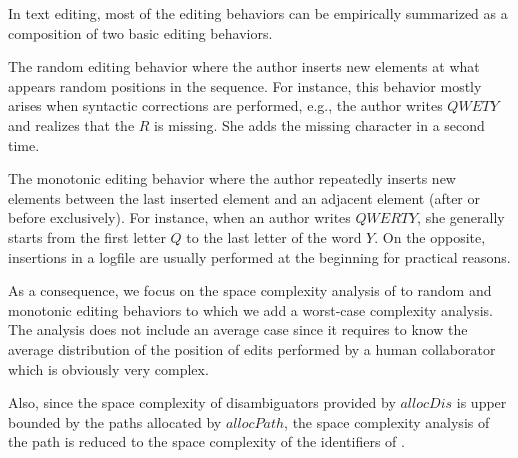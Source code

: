


In text editing, most of the editing behaviors can be empirically summarized
as a composition of two basic editing behaviors.
\begin{inparaenum}[(i)]
\item The random editing behavior where the author inserts new elements at
  what appears random positions in the sequence. For instance, this behavior
  mostly arises when syntactic corrections are performed, e.g., the author
  writes $QWETY$ and realizes that the $R$ is missing. She adds the missing
  character in a second time.
\item The monotonic editing behavior where the author repeatedly inserts new
  elements between the last inserted element and an adjacent element (after or
  before exclusively). For instance, when an author writes $QWERTY$, she
  generally starts from the first letter $Q$ to the last letter of the word
  $Y$. On the opposite, insertions in a logfile are usually performed at the
  beginning for practical reasons.
\end{inparaenum}

As a consequence, we focus on the space complexity analysis of \LSEQ to
random and monotonic editing behaviors to which we add a worst-case complexity
analysis.  The analysis does not include an average case since it requires to
know the average distribution of the position of edits performed by a human
collaborator which is obviously very complex.

Also, since the space complexity of disambiguators provided by $allocDis$ is
upper bounded by the paths allocated by $allocPath$, the space complexity
analysis of the path is reduced to the space complexity of the identifiers of
\LSEQ.

